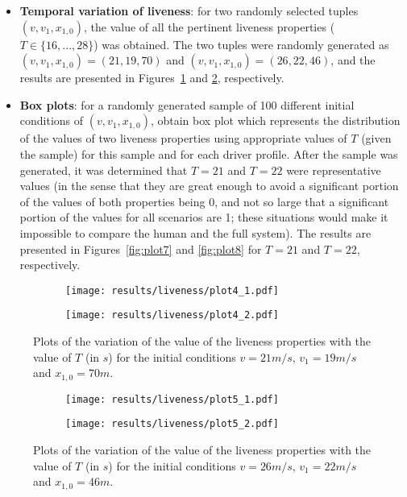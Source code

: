 \begin{itemize}
	\item \textbf{Temporal variation of liveness}: for two randomly selected tuples $(v, v_1, x_{1,0})$, the value of all the pertinent liveness properties ($T \in \{16,...,28\}$) was obtained. The two tuples were randomly generated as $(v, v_1, x_{1,0}) = (21, 19, 70)$ and $(v, v_1, x_{1,0}) = (26, 22, 46)$, and the results are presented in Figures~\ref{fig:plot4} and \ref{fig:plot5}, respectively.
	\item \textbf{Box plots}: for a randomly generated sample of 100 different initial conditions of $(v, v_1, x_{1,0})$, obtain box plot which represents the distribution of the values of two liveness properties using appropriate values of $T$ (given the sample) for this sample and for each driver profile. After the sample was generated, it was determined that $T=21$ and $T=22$ were representative values (in the sense that they are great enough to avoid a significant portion of the values of both properties being 0, and not so large that a significant portion of the values for all scenarios are 1; these situations would make it impossible to compare the human and the full system). The results are presented in Figures~\ref{fig:plot7} and \ref{fig:plot8} for $T=21$ and $T=22$, respectively.
\end{itemize}

\begin{figure}[H]
\centering
\begin{subfigure}{0.75\textwidth}
  \centering
  \texttt{[image: results/liveness/plot4\_1.pdf]}
\end{subfigure}
\begin{subfigure}{0.75\textwidth}
  \centering
  \texttt{[image: results/liveness/plot4\_2.pdf]}
\end{subfigure} 
\caption{Plots of the variation of the value of the liveness properties with the value of $T$ (in $s$) for the initial conditions $v = 21m/s$, $v_1 = 19m/s$ and $x_{1,0} = 70m$.}
\label{fig:plot4}
\end{figure}

\begin{figure}[H]
\centering
\begin{subfigure}{0.75\textwidth}
  \centering
  \texttt{[image: results/liveness/plot5\_1.pdf]}
\end{subfigure}
\begin{subfigure}{0.75\textwidth}
  \centering
  \texttt{[image: results/liveness/plot5\_2.pdf]}
\end{subfigure} 
\caption{Plots of the variation of the value of the liveness properties with the value of $T$ (in $s$) for the initial conditions $v = 26m/s$, $v_1 = 22m/s$ and $x_{1,0} = 46m$.}
\label{fig:plot5}
\end{figure}

